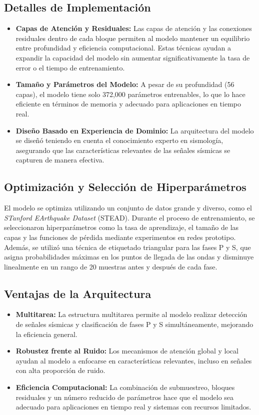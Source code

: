 \subsection{Detalles de Implementación}

\begin{itemize}
    \item \textbf{Capas de Atención y Residuales:} Las capas de atención y las conexiones residuales dentro de cada bloque permiten al modelo mantener un equilibrio entre profundidad y eficiencia computacional. Estas técnicas ayudan a expandir la capacidad del modelo sin aumentar significativamente la tasa de error o el tiempo de entrenamiento.
    \item \textbf{Tamaño y Parámetros del Modelo:} A pesar de su profundidad (56 capas), el modelo tiene solo 372,000 parámetros entrenables, lo que lo hace eficiente en términos de memoria y adecuado para aplicaciones en tiempo real.
    \item \textbf{Diseño Basado en Experiencia de Dominio:} La arquitectura del modelo se diseñó teniendo en cuenta el conocimiento experto en sismología, asegurando que las características relevantes de las señales sísmicas se capturen de manera efectiva.
\end{itemize}

\subsection{Optimización y Selección de Hiperparámetros}

El modelo se optimiza utilizando un conjunto de datos grande y diverso, como el \textit{STanford EArthquake Dataset} (STEAD). Durante el proceso de entrenamiento, se seleccionaron hiperparámetros como la tasa de aprendizaje, el tamaño de las capas y las funciones de pérdida mediante experimentos en redes prototipo. Además, se utilizó una técnica de etiquetado triangular para las fases P y S, que asigna probabilidades máximas en los puntos de llegada de las ondas y disminuye linealmente en un rango de 20 muestras antes y después de cada fase.

\subsection{Ventajas de la Arquitectura}

\begin{itemize}
    \item \textbf{Multitarea:} La estructura multitarea permite al modelo realizar detección de señales sísmicas y clasificación de fases P y S simultáneamente, mejorando la eficiencia general.
    \item \textbf{Robustez frente al Ruido:} Los mecanismos de atención global y local ayudan al modelo a enfocarse en características relevantes, incluso en señales con alta proporción de ruido.
    \item \textbf{Eficiencia Computacional:} La combinación de submuestreo, bloques residuales y un número reducido de parámetros hace que el modelo sea adecuado para aplicaciones en tiempo real y sistemas con recursos limitados.
\end{itemize}

